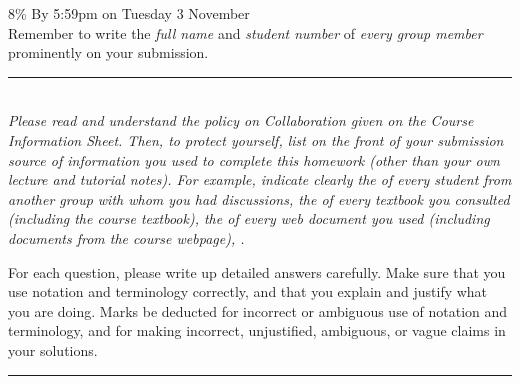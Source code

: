 \documentclass[11pt,twoside]{article}
\begin{document}
\noindent
{}  8\%
\hfill
{}  By 5:59pm on Tuesday 3 November\\[2ex]
\strong
   {Remember to write
    the \emph{full name} and \emph{student number}
    of \emph{every group member}
    prominently on your submission.}

\medskip

\noindent
\rule{\textwidth}{.5pt}\\[1ex]
\begingroup\slshape
    Please read and understand the policy on Collaboration
    given on the Course Information Sheet.
    Then, to protect yourself,
    list on the front of your submission
     source of information
    you used to complete this homework
    (other than your own lecture and tutorial notes).
    For example, indicate clearly
    the  of every student from another group
    with whom you had discussions,
    the  of every textbook you consulted
    (including the course textbook),
    the  of every web document you used
    (including documents from the course webpage),
    \etc.\par
        For each question, please write up detailed answers carefully.
    Make sure that you use notation and terminology correctly, and
    that you explain and justify what you are doing.
    Marks  be deducted
    for incorrect or ambiguous use of notation and terminology, and
    for making incorrect, unjustified, ambiguous, or vague claims
    in your solutions.
\endgroup\\
\rule{\textwidth}{.5pt}
\end{document}
